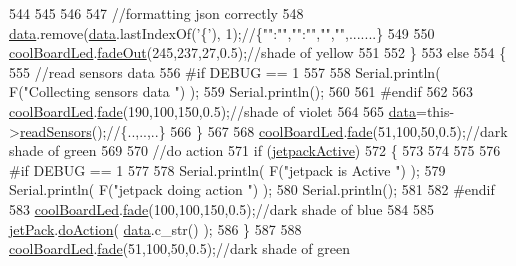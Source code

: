 \begin{DoxyCode}
544 
545         
546 
547         \textcolor{comment}{//formatting json correctly}
548         \hyperlink{class_cool_board_a427fb753dd8575bdf821c70a5c63d695}{data}.remove(\hyperlink{class_cool_board_a427fb753dd8575bdf821c70a5c63d695}{data}.lastIndexOf(\textcolor{charliteral}{'\{'}), 1);\textcolor{comment}{//\{"":"","":"","","",.......\}}
549 
550         \hyperlink{class_cool_board_a1b1d3c684a5baa56b08486e192fd8e97}{coolBoardLed}.\hyperlink{class_cool_board_led_a93d545679237e8cc858324367149775c}{fadeOut}(245,237,27,0.5);\textcolor{comment}{//shade of yellow}
551                 
552     \}   
553     \textcolor{keywordflow}{else}
554     \{
555         \textcolor{comment}{//read sensors data}
556 \textcolor{preprocessor}{    #if DEBUG == 1}
557 
558         Serial.println( F(\textcolor{stringliteral}{"Collecting sensors data "}) );
559         Serial.println();
560 
561 \textcolor{preprocessor}{    #endif}
562 
563         \hyperlink{class_cool_board_a1b1d3c684a5baa56b08486e192fd8e97}{coolBoardLed}.\hyperlink{class_cool_board_led_af1cacbaa88db8bcf6042c1083ba41155}{fade}(190,100,150,0.5);\textcolor{comment}{//shade of violet        }
564 
565         \hyperlink{class_cool_board_a427fb753dd8575bdf821c70a5c63d695}{data}=this->\hyperlink{class_cool_board_ad03abdce2e65f520bbf2cff0f2d083cf}{readSensors}();\textcolor{comment}{//\{..,..,..\}}
566     \}
567 
568     \hyperlink{class_cool_board_a1b1d3c684a5baa56b08486e192fd8e97}{coolBoardLed}.\hyperlink{class_cool_board_led_af1cacbaa88db8bcf6042c1083ba41155}{fade}(51,100,50,0.5);\textcolor{comment}{//dark shade of green  }
569 
570     \textcolor{comment}{//do action}
571     \textcolor{keywordflow}{if} (\hyperlink{class_cool_board_a9be03a913d26e558328935ca3b59a75e}{jetpackActive})
572     \{
573     
574 
575 
576 \textcolor{preprocessor}{    #if DEBUG == 1}
577 
578         Serial.println( F(\textcolor{stringliteral}{"jetpack is Active "}) );
579         Serial.println( F(\textcolor{stringliteral}{"jetpack doing action "}) );
580         Serial.println();
581     
582 \textcolor{preprocessor}{    #endif}
583         \hyperlink{class_cool_board_a1b1d3c684a5baa56b08486e192fd8e97}{coolBoardLed}.\hyperlink{class_cool_board_led_af1cacbaa88db8bcf6042c1083ba41155}{fade}(100,100,150,0.5);\textcolor{comment}{//dark shade of blue }
584     
585         \hyperlink{class_cool_board_a30b1357881b01ccbec676856a91e48e9}{jetPack}.\hyperlink{class_jetpack_a9e703197093094b963f9ad57817495b8}{doAction}( \hyperlink{class_cool_board_a427fb753dd8575bdf821c70a5c63d695}{data}.c\_str() );
586     \}
587     
588     \hyperlink{class_cool_board_a1b1d3c684a5baa56b08486e192fd8e97}{coolBoardLed}.\hyperlink{class_cool_board_led_af1cacbaa88db8bcf6042c1083ba41155}{fade}(51,100,50,0.5);\textcolor{comment}{//dark shade of green  }

\end{DoxyCode}

